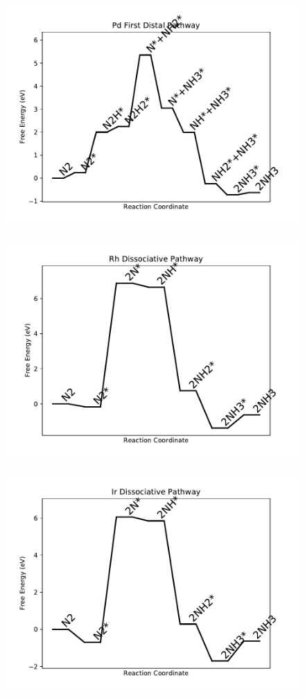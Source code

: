\begin{figure}
\includegraphics[width=0.8\linewidth]{data/plots/Pd_distal_1.pdf}
\label{fig:Pd_distal_1}
\end{figure}

\begin{figure}
\includegraphics[width=0.8\linewidth]{data/plots/Rh_dissociative.pdf}
\label{fig:Rh_dissociative}
\end{figure}

\begin{figure}
\includegraphics[width=0.8\linewidth]{data/plots/Ir_dissociative.pdf}
\label{fig:Ir_dissociative}
\end{figure}

